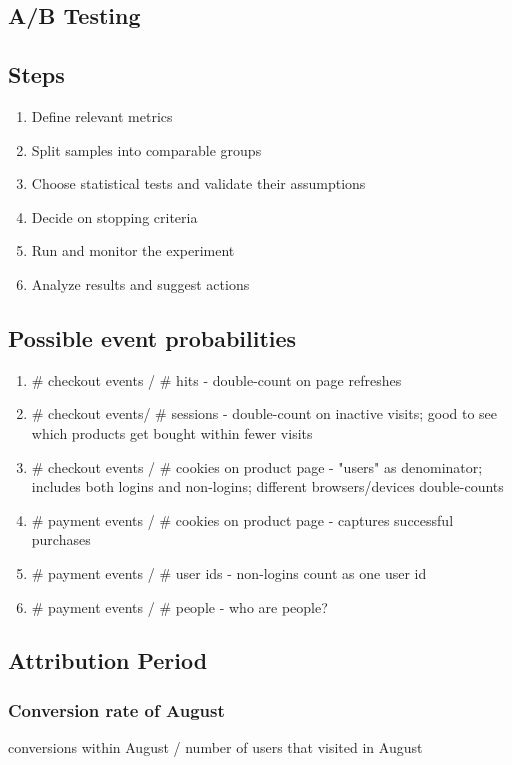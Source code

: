 \documentclass[]{article}
\begin{document}
\begin{multicols}{2}
    \section*{A/B Testing}
    \subsection*{Steps}
    \begin{enumerate}
        \item Define relevant metrics
        \item Split samples into comparable groups
        \item Choose statistical tests and validate their assumptions
        \item Decide on stopping criteria
        \item Run and monitor the experiment
        \item Analyze results and suggest actions
    \end{enumerate}
    \subsection*{Possible event probabilities}
    \begin{enumerate}
        \item \# checkout events / \# hits - double-count on page refreshes
        \item \# checkout events/ \# sessions - double-count on inactive visits; good to see which products get bought within fewer visits
        \item \# checkout events / \# cookies on product page - "users" as denominator; includes both logins and non-logins; different browsers/devices double-counts
        \item \# payment events / \# cookies on product page - captures successful purchases
        \item \# payment events / \# user ids - non-logins count as one user id
        \item \# payment events / \# people - who are people?
    \end{enumerate}
    \subsection*{Attribution Period}
    \subsubsection*{Conversion rate of August}
    conversions within August / number of users that visited in August

\end{multicols}
\end{document}
